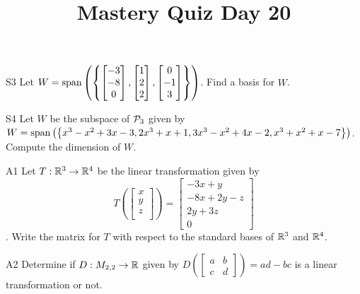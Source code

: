\documentclass{sbgLAquiz}
\title{Mastery Quiz Day 20 }
\begin{document}
\begin{problem}{S3}
Let $W = {\rm span} \left( \left\{  \begin{bmatrix} -3 \\ -8 \\ 0 \end{bmatrix}, \begin{bmatrix} 1 \\ 2 \\ 2 \end{bmatrix}, \begin{bmatrix} 0 \\ -1 \\ 3 \end{bmatrix} \right\} \right)$.   Find a basis for $W$.
\end{problem}

\begin{problem}{S4}
Let $W$ be the subspace of $\P_3$ given by $W={\rm span}\left( \left\{ x^3-x^2+3x-3, 2x^3+x+1, 3x^3-x^2+4x-2, x^3+x^2+x-7\right\}\right)$.  Compute the dimension of $W$.
\end{problem}
\newpage

\begin{problem}{A1}
Let $T: \IR^3\rightarrow \IR^4$ be the linear transformation given by $$T\left(\begin{bmatrix} x \\ y \\ z \\  \end{bmatrix} \right) = \begin{bmatrix} -3x+y \\ -8x+2y-z \\ 2y+3z \\ 0 \end{bmatrix}$$.  Write the matrix for $T$ with respect to the standard bases of $\IR^3$ and $\IR^4$.
\end{problem}

\begin{problem}{A2}
Determine if $D: M_{2,2} \rightarrow \IR$ given by $D\left(\begin{bmatrix} a & b \\ c & d \end{bmatrix} \right) = ad-bc$ is a linear transformation or not.
\end{problem}
\end{document}

